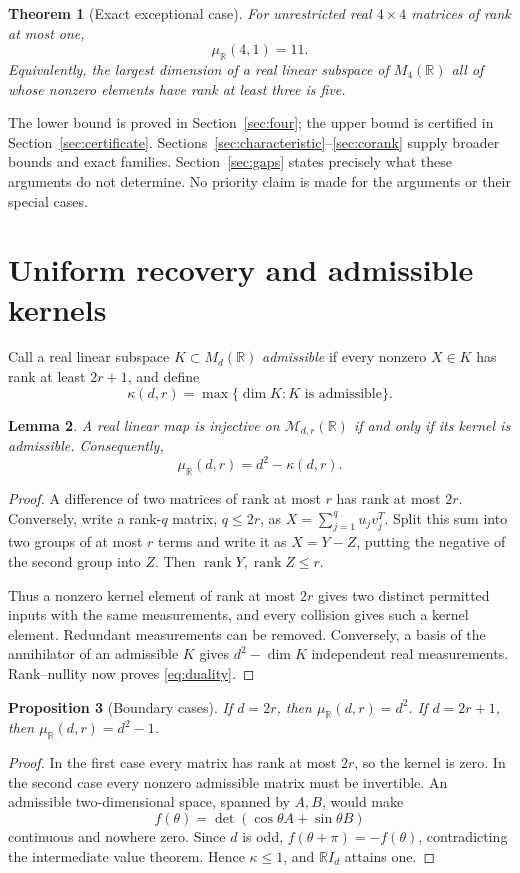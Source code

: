 \documentclass[11pt]{article}
\newtheorem{theorem}{Theorem}[section]
\newtheorem{proposition}[theorem]{Proposition}
\newtheorem{lemma}[theorem]{Lemma}
\theoremstyle{definition}
\newcommand{\R}{\mathbb R}
\newcommand{\rank}{\operatorname{rank}}
\newcommand{\muR}{\mu_{\R}}
\begin{document}
\begin{theorem}[Exact exceptional case]\label{thm:main}
For unrestricted real $4\times4$ matrices of rank at most one,
\[
 \boxed{\muR(4,1)=11.}
\]
Equivalently, the largest dimension of a real linear subspace of $M_4(\R)$ all of whose nonzero elements have rank at least three is five.
\end{theorem}

The lower bound is proved in Section~\ref{sec:four}; the upper bound is certified in Section~\ref{sec:certificate}. Sections~\ref{sec:characteristic}--\ref{sec:corank} supply broader bounds and exact families. Section~\ref{sec:gaps} states precisely what these arguments do not determine. No priority claim is made for the arguments or their special cases.

\section{Uniform recovery and admissible kernels}\label{sec:kernel}
Call a real linear subspace $K\subset M_d(\R)$ \emph{admissible} if every nonzero $X\in K$ has rank at least $2r+1$, and define
\[
 \kappa(d,r)=\max\{\dim K:K\text{ is admissible}\}.
\]

\begin{lemma}\label{lem:kernel}
A real linear map is injective on $\mathcal M_{d,r}(\R)$ if and only if its kernel is admissible. Consequently,
\begin{equation}\label{eq:duality}
 \muR(d,r)=d^2-\kappa(d,r).
\end{equation}
\end{lemma}
\begin{proof}
A difference of two matrices of rank at most $r$ has rank at most $2r$. Conversely, write a rank-$q$ matrix, $q\leq2r$, as
$X=\sum_{j=1}^q u_jv_j^T$. Split this sum into two groups of at most $r$ terms and write it as $X=Y-Z$, putting the negative of the second group into $Z$. Then $\rank Y,\rank Z\leq r$.

Thus a nonzero kernel element of rank at most $2r$ gives two distinct permitted inputs with the same measurements, and every collision gives such a kernel element. Redundant measurements can be removed. Conversely, a basis of the annihilator of an admissible $K$ gives $d^2-\dim K$ independent real measurements. Rank--nullity now proves \eqref{eq:duality}.
\end{proof}

\begin{proposition}[Boundary cases]\label{prop:boundary}
If $d=2r$, then $\muR(d,r)=d^2$. If $d=2r+1$, then $\muR(d,r)=d^2-1$.
\end{proposition}
\begin{proof}
In the first case every matrix has rank at most $2r$, so the kernel is zero. In the second case every nonzero admissible matrix must be invertible. An admissible two-dimensional space, spanned by $A,B$, would make
\[
 f(\theta)=\det(\cos\theta A+\sin\theta B)
\]
continuous and nowhere zero. Since $d$ is odd, $f(\theta+\pi)=-f(\theta)$, contradicting the intermediate value theorem. Hence $\kappa\leq1$, and $\R I_d$ attains one.
\end{proof}
\end{document}
